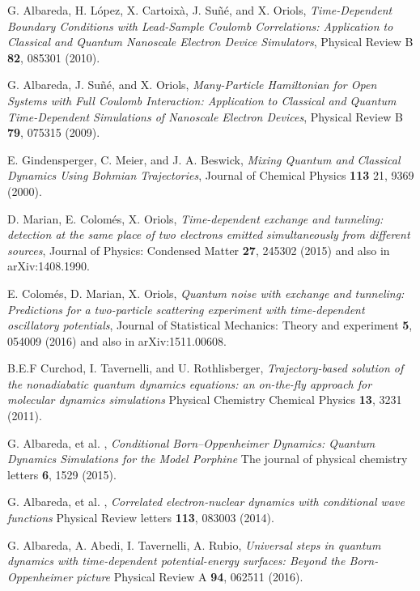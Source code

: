 \documentclass[nofootinbib, secnumarabic, amsmath, nobibnotes,11pt,aps,pra, floatfix]{revtex4-1}
\begin{document}
\begin{thebibliography}{999}
G. Albareda, H. L\'{o}pez, X. Cartoix\`{a}, J.  Su\~{n}\'{e}, and X.
Oriols, \emph{Time-Dependent Boundary Conditions with Lead-Sample
Coulomb  Correlations: Application to Classical and Quantum
Nanoscale Electron Device Simulators}, Physical Review B \textbf{82},  085301 (2010).

G. Albareda, J. Su\~{n}\'{e}, and X. Oriols, \emph{Many-Particle Hamiltonian for Open Systems with Full Coulomb Interaction: Application to Classical and Quantum Time-Dependent Simulations of Nanoscale Electron Devices}, Physical Review B \textbf{79},  075315 (2009).

E. Gindensperger, C. Meier, and J. A. Beswick, \emph{Mixing Quantum and Classical Dynamics Using Bohmian Trajectories}, Journal of Chemical Physics \textbf{113} 21,  9369 (2000).

 D. Marian, E. Colom\'{e}s, X. Oriols, \emph{Time-dependent exchange and tunneling: detection at the same place of two electrons emitted simultaneously from different sources},  Journal of Physics: Condensed Matter  {\bf 27},  245302 (2015) and also in arXiv:1408.1990.  

E. Colom\'{e}s, D. Marian, X. Oriols, \emph{Quantum noise with exchange and tunneling: Predictions for a two-particle scattering experiment with time-dependent oscillatory potentials}, Journal of Statistical Mechanics: Theory and experiment {\bf 5},  054009 (2016) and also in arXiv:1511.00608.  


B.E.F Curchod, I. Tavernelli, and U. Rothlisberger, \emph{Trajectory-based solution of the nonadiabatic quantum dynamics equations: an on-the-fly approach for molecular dynamics simulations} Physical Chemistry Chemical Physics \textbf{13},  3231 (2011).

G. Albareda, et al. , \emph{Conditional Born–Oppenheimer Dynamics: Quantum Dynamics Simulations for the Model Porphine} The journal of physical chemistry letters \textbf{6},  1529 (2015).

G. Albareda, et al. , \emph{Correlated electron-nuclear dynamics with conditional wave functions} Physical Review letters \textbf{113},  083003 (2014).

G. Albareda, A. Abedi, I. Tavernelli, A. Rubio, \emph{Universal steps in quantum dynamics with time-dependent potential-energy surfaces: Beyond the Born-Oppenheimer picture} Physical Review A \textbf{94},  062511 (2016).


\end{thebibliography}
\end{document}
